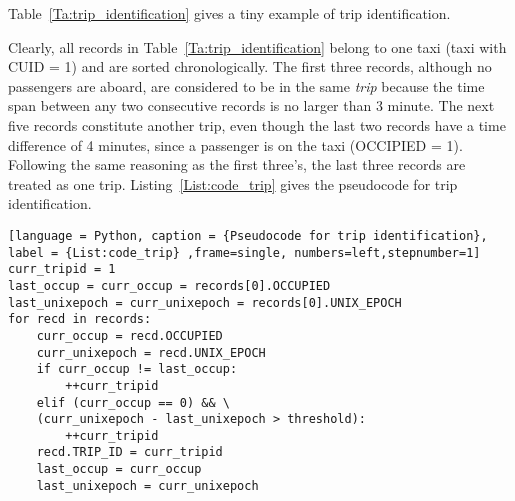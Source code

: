 Table~\ref{Ta:trip_identification} gives a tiny example of trip identification.

\begin{table}[h]
\centering
{}
\caption{An example of trip identification}\label{Ta:trip_identification}
\end{table}

Clearly, all records in Table~\ref{Ta:trip_identification} belong to one taxi (taxi with CUID = 1) and are sorted chronologically. The first three records, although no passengers are aboard, are considered to be in the same \emph{trip} because the time span between any two consecutive records is no larger than 3 minute. The next five records constitute another trip, even though the last two records have a time difference of 4 minutes, since a passenger is on the taxi (OCCIPIED = 1). Following the same reasoning as the first three's, the last three records are treated as one trip. Listing~\ref{List:code_trip} gives the pseudocode for trip identification.

\begin{lstlisting}[language = Python, caption = {Pseudocode for trip identification}, label = {List:code_trip} ,frame=single, numbers=left,stepnumber=1]
curr_tripid = 1
last_occup = curr_occup = records[0].OCCUPIED
last_unixepoch = curr_unixepoch = records[0].UNIX_EPOCH
for recd in records:
	curr_occup = recd.OCCUPIED
	curr_unixepoch = recd.UNIX_EPOCH
	if curr_occup != last_occup:
		++curr_tripid
	elif (curr_occup == 0) && \
	(curr_unixepoch - last_unixepoch > threshold):
		++curr_tripid
	recd.TRIP_ID = curr_tripid
	last_occup = curr_occup
	last_unixepoch = curr_unixepoch
\end{lstlisting}

